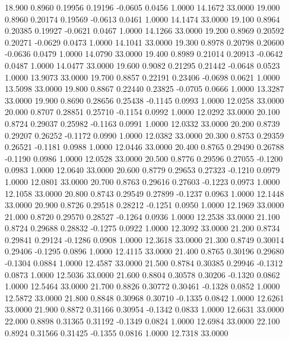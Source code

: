   18.900   0.8960   0.19956   0.19196  -0.0605   0.0456   1.0000  14.1672  33.0000
  19.000   0.8960   0.20174   0.19569  -0.0613   0.0461   1.0000  14.1474  33.0000
  19.100   0.8964   0.20385   0.19927  -0.0621   0.0467   1.0000  14.1266  33.0000
  19.200   0.8969   0.20592   0.20271  -0.0629   0.0473   1.0000  14.1041  33.0000
  19.300   0.8978   0.20798   0.20600  -0.0636   0.0479   1.0000  14.0790  33.0000
  19.400   0.8989   0.21014   0.20913  -0.0642   0.0487   1.0000  14.0477  33.0000
  19.600   0.9082   0.21295   0.21442  -0.0648   0.0523   1.0000  13.9073  33.0000
  19.700   0.8857   0.22191   0.23406  -0.0698   0.0621   1.0000  13.5098  33.0000
  19.800   0.8867   0.22440   0.23825  -0.0705   0.0666   1.0000  13.3287  33.0000
  19.900   0.8690   0.28656   0.25438  -0.1145   0.0993   1.0000  12.0258  33.0000
  20.000   0.8707   0.28851   0.25710  -0.1154   0.0992   1.0000  12.0292  33.0000
  20.100   0.8724   0.29037   0.25982  -0.1163   0.0991   1.0000  12.0332  33.0000
  20.200   0.8739   0.29207   0.26252  -0.1172   0.0990   1.0000  12.0382  33.0000
  20.300   0.8753   0.29359   0.26521  -0.1181   0.0988   1.0000  12.0446  33.0000
  20.400   0.8765   0.29490   0.26788  -0.1190   0.0986   1.0000  12.0528  33.0000
  20.500   0.8776   0.29596   0.27055  -0.1200   0.0983   1.0000  12.0640  33.0000
  20.600   0.8779   0.29653   0.27323  -0.1210   0.0979   1.0000  12.0801  33.0000
  20.700   0.8763   0.29616   0.27603  -0.1223   0.0973   1.0000  12.1058  33.0000
  20.800   0.8743   0.29549   0.27899  -0.1237   0.0963   1.0000  12.1448  33.0000
  20.900   0.8726   0.29518   0.28212  -0.1251   0.0950   1.0000  12.1969  33.0000
  21.000   0.8720   0.29570   0.28527  -0.1264   0.0936   1.0000  12.2538  33.0000
  21.100   0.8724   0.29688   0.28832  -0.1275   0.0922   1.0000  12.3092  33.0000
  21.200   0.8734   0.29841   0.29124  -0.1286   0.0908   1.0000  12.3618  33.0000
  21.300   0.8749   0.30014   0.29406  -0.1295   0.0896   1.0000  12.4115  33.0000
  21.400   0.8765   0.30196   0.29680  -0.1304   0.0884   1.0000  12.4587  33.0000
  21.500   0.8784   0.30385   0.29946  -0.1312   0.0873   1.0000  12.5036  33.0000
  21.600   0.8804   0.30578   0.30206  -0.1320   0.0862   1.0000  12.5464  33.0000
  21.700   0.8826   0.30772   0.30461  -0.1328   0.0852   1.0000  12.5872  33.0000
  21.800   0.8848   0.30968   0.30710  -0.1335   0.0842   1.0000  12.6261  33.0000
  21.900   0.8872   0.31166   0.30954  -0.1342   0.0833   1.0000  12.6631  33.0000
  22.000   0.8898   0.31365   0.31192  -0.1349   0.0824   1.0000  12.6984  33.0000
  22.100   0.8924   0.31566   0.31425  -0.1355   0.0816   1.0000  12.7318  33.0000
